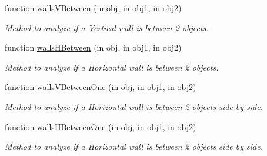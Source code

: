 \begin{DoxyCompactItemize}
function \hyperlink{class_model_laby_adf2ec45a05676923165cb7f273900569}{walls\+V\+Between} (in obj, in obj1, in obj2)
\begin{DoxyCompactList}\small\item\em Method to analyze if a Vertical wall is between 2 objects. \end{DoxyCompactList}\item 
function \hyperlink{class_model_laby_a488955f2ead0854b15302161753a0a66}{walls\+H\+Between} (in obj, in obj1, in obj2)
\begin{DoxyCompactList}\small\item\em Method to analyze if a Horizontal wall is between 2 objects. \end{DoxyCompactList}\item 
function \hyperlink{class_model_laby_ab8486279acbf0a66424a84fa210d1b71}{walls\+V\+Between\+One} (in obj, in obj1, in obj2)
\begin{DoxyCompactList}\small\item\em Method to analyze if a Horizontal wall is between 2 objects side by side. \end{DoxyCompactList}\item 
function \hyperlink{class_model_laby_a450d4d89542d177b6676375984146f4c}{walls\+H\+Between\+One} (in obj, in obj1, in obj2)
\begin{DoxyCompactList}\small\item\em Method to analyze if a Horizontal wall is between 2 objects side by side. \end{DoxyCompactList}\end{DoxyCompactItemize}
